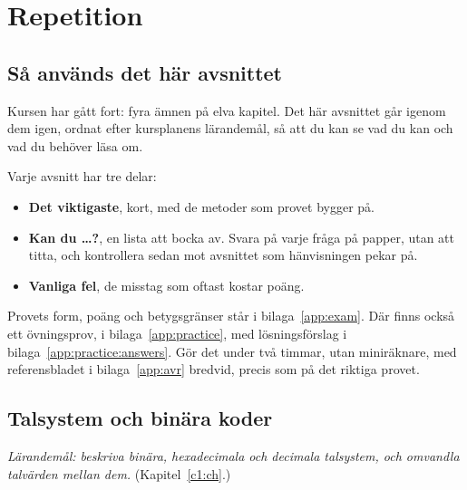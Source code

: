 
\section{Repetition}
\label{c12:app:a}

\subsection{Så används det här avsnittet}
\label{c12:a1}
Kursen har gått fort: fyra ämnen på elva kapitel. Det här avsnittet går igenom dem igen, ordnat
efter kursplanens lärandemål, så att du kan se vad du kan och vad du behöver läsa om.

Varje avsnitt har tre delar:
\begin{itemize}
  \item \textbf{Det viktigaste}, kort, med de metoder som provet bygger på.
  \item \textbf{Kan du \dots?}, en lista att bocka av. Svara på varje fråga på papper, utan att
    titta, och kontrollera sedan mot avsnittet som hänvisningen pekar på.
  \item \textbf{Vanliga fel}, de misstag som oftast kostar poäng.
\end{itemize}

Provets form, poäng och betygsgränser står i bilaga~\ref{app:exam}. Där finns också ett övningsprov,
i bilaga~\ref{app:practice}, med lösningsförslag i bilaga~\ref{app:practice:answers}. Gör det under
två timmar, utan miniräknare, med referensbladet i bilaga~\ref{app:avr} bredvid, precis som på det
riktiga provet.

\subsection{Talsystem och binära koder}
\label{c12:a2}
\emph{Lärandemål: beskriva binära, hexadecimala och decimala talsystem, och omvandla talvärden
mellan dem.} (Kapitel~\ref{c1:ch}.)

